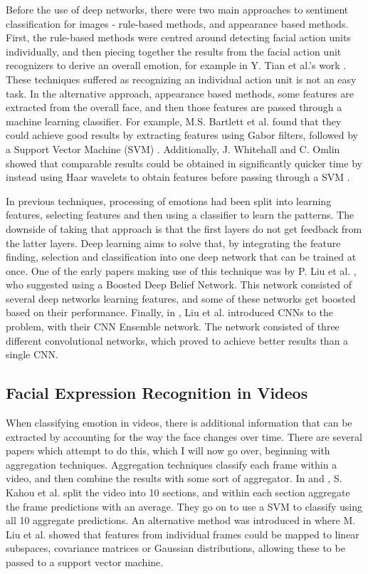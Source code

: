 \documentclass[sigconf]{acmart}
\begin{document}
{Before the use of deep networks, there were two main approaches to sentiment
classification for images - rule-based methods, and appearance based methods.
First, the rule-based methods were centred around detecting facial action
units individually, and then piecing together the results from the facial
action unit recognizers to derive an overall emotion, for example in Y. Tian
et al.'s work \cite{tian2001recognizing}. These techniques
suffered as recognizing an individual action unit is not an easy task. In the
alternative approach, appearance based methods, some features are extracted
from the overall face, and then those features are passed through a machine
learning classifier. For example, M.S. Bartlett et al. found that they could
achieve good results by extracting features using Gabor filters, followed by a
Support Vector Machine (SVM) \cite{bartlett2005recognizing}. Additionally, J.
Whitehall and C. Omlin showed that comparable results could be obtained in
significantly quicker time by instead using Haar wavelets to obtain features
before passing through a SVM \cite{whitehill2006haar}. 

In previous techniques, processing of emotions had been split into learning
features, selecting features and then using a classifier to learn the
patterns. The downside of taking that approach is that the first layers do not
get feedback from the latter layers. Deep learning aims to solve that, by
integrating the feature finding, selection and classification into one deep
network that can be trained at once. One of the early papers making use of
this technique was by P. Liu et al. \cite{liu2014facial}, who suggested using
a Boosted Deep Belief Network. This network consisted of several deep networks
learning features, and some of these networks get boosted based on their
performance. Finally, in \cite{liu2016facial}, Liu et al. introduced CNNs to the 
problem, with their CNN Ensemble network. The network consisted of three 
different convolutional networks, which proved to achieve better results than
a single CNN.

\subsection{Facial Expression Recognition in Videos}

When classifying emotion in videos, there is additional information that can
be extracted by accounting for the way the face changes over time. There are
several papers which attempt to do this, which I will now go over, beginning
with aggregation techniques. Aggregation techniques classify each frame within
a video, and then combine the results with some sort of aggregator. In
\cite{kahou2016emonets} and \cite{kahou2013combining}, S. Kahou et al. split
the video into 10 sections, and within each section aggregate the frame
predictions with an average. They go on to use a SVM to classify using all 10
aggregate predictions. An alternative method was introduced in 
\cite{liu2014combining} where
M. Liu et al. showed that features from individual frames could be mapped to 
linear subspaces, covariance matrices or Gaussian distributions, allowing
these to be passed to a support vector machine.

}
\end{document}
